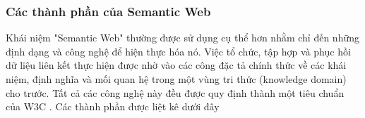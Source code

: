 \subsubsection{Các thành phần của Semantic Web}
Khái niệm "Semantic Web" thường được sử dụng cụ thể hơn nhằm chỉ đến những định dạng và công nghệ để hiện thực hóa nó. Việc tổ chức, tập hợp và phục hồi dữ liệu liên kết thực hiện được nhờ vào các công đặc tả chính thức về các khái niệm, định nghĩa và mối quan hệ trong một vùng tri thức (knowledge domain) cho trước. Tất cả các công nghệ này đều được quy định thành một tiêu chuẩn của W3C \cite{semantic2}. Các thành phần được liệt kê dưới đây




